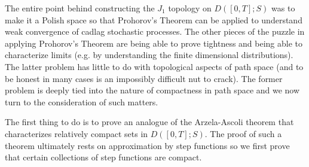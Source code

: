 The entire point behind constructing the $J_1$ topology on $D([0,T]; S)$ was to
make it a Polish space so that Prohorov's Theorem can be applied to understand
weak convergence of cadlag stochastic processes.  The other pieces of the puzzle
in applying Prohorov's Theorem are being able to prove tightness and being able to
characterize limits (e.g. by understanding the finite dimensional distributions).  The latter
problem has little to do with topological aspects of path space (and to be honest in many
cases is an impossibly difficult nut to crack).  The former problem is deeply tied into the
nature of compactness in path space and we now turn to the consideration of such matters.

The first thing to do is to prove an analogue of the Arzela-Ascoli theorem that characterizes
relatively compact sets in $D([0,T]; S)$.  The proof of such a theorem ultimately rests on
approximation by step functions so we first prove that certain collections of step functions
are compact.

